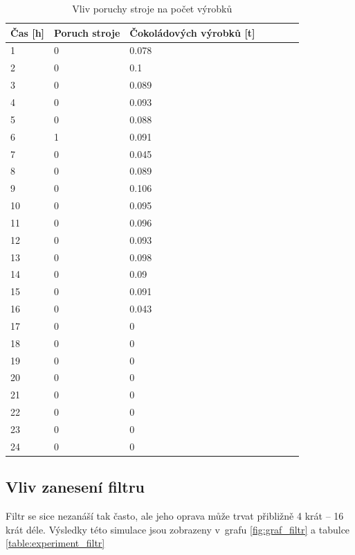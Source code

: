 \documentclass[11pt,a4paper,titlepage]{article}
\begin{document}
				\begin{table}[H]
				    \centering
				    \begin{tabular}{|l|l|l|l|l|l|l|}
				    	\hline
					    Čas [h] &  Poruch stroje &  Čokoládových výrobků [t] \\ \hline
					    1 &  0 &  0.078 \\
					    2 &  0 &  0.1 \\
					    3 &  0 &  0.089 \\
					    4 &  0 &  0.093 \\
					    5 &  0 &  0.088 \\
					    6 &  1 &  0.091 \\
					    7 &  0 &  0.045 \\
					    8 &  0 &  0.089 \\
					    9 &  0 &  0.106 \\
					    10 &  0 &  0.095 \\
					    11 &  0 &  0.096 \\
					    12 &  0 &  0.093 \\
					    13 &  0 &  0.098 \\
					    14 &  0 &  0.09 \\
					    15 &  0 &  0.091 \\
					    16 &  0 &  0.043 \\
					    17 &  0 &  0 \\
					    18 &  0 &  0 \\
					    19 &  0 &  0 \\
					    20 &  0 &  0 \\
					    21 &  0 &  0 \\
					    22 &  0 &  0 \\
					    23 &  0 &  0 \\
					    24 &  0 &  0 \\ \hline
				    \end{tabular}
				    \caption{Vliv poruchy stroje na počet výrobků}
				    \label{table:experiment_stroj}
				\end{table}

			\subsection{Vliv zanesení filtru}
				Filtr se sice nezanáší tak často, ale jeho oprava může trvat přibližně 4 krát -- 16 krát
				déle. Výsledky této simulace jsou zobrazeny v~grafu \ref{fig:graf_filtr} a
				tabulce \ref{table:experiment_filtr}
\end{document}
